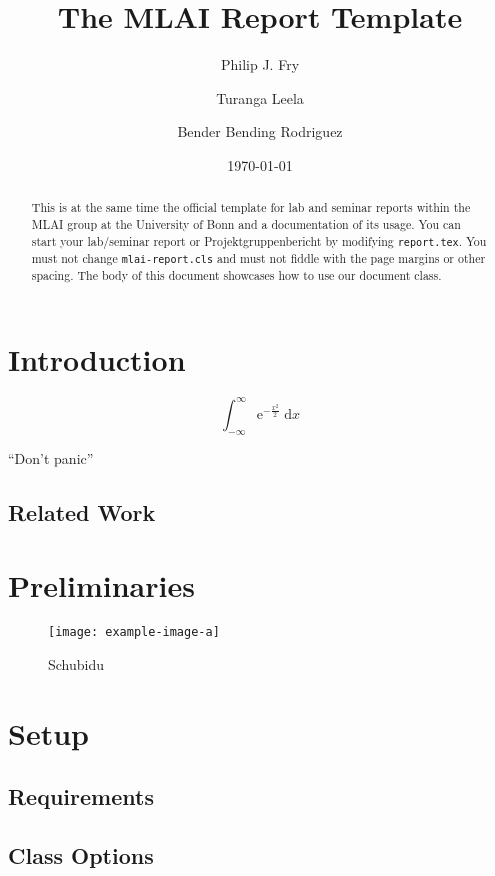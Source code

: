 \documentclass[logo]{mlai-report}
\title{The MLAI Report Template}
\author{Philip J. Fry \and Turanga Leela \and Bender Bending Rodriguez}
\date{\today}
\begin{document}
	\maketitle
	
	\begin{abstract}
		This is at the same time the official template for lab and seminar reports within the MLAI group at the University of Bonn and a documentation of its usage.
		You can start your lab/seminar report or Projektgruppenbericht by modifying \texttt{report.tex}.
		You must not change \texttt{mlai-report.cls} and must not fiddle with the page margins or other spacing.
		The body of this document showcases how to use our document class.
	\end{abstract}
	

	\section{Introduction}
	
	\begin{equation}
	\int_{-\infty}^\infty \mathrm{e}^{-\frac{x^2}{2}} \; \mathrm{d}x 
	\end{equation}
	
	\enquote{Don't panic} \parencite{adams1979} \blindtext
	
	\subsection{Related Work}
	
	\section{Preliminaries} 

	\begin{figure}[tp] 
		\centering
		\texttt{[image: example-image-a]} 
		\caption{Schubidu} 
		\label{fig:example-image} 
	\end{figure}

	\section{Setup} 
	
	\subsection{Requirements} 
	
	\subsection{Class Options} 
	
\end{document}
